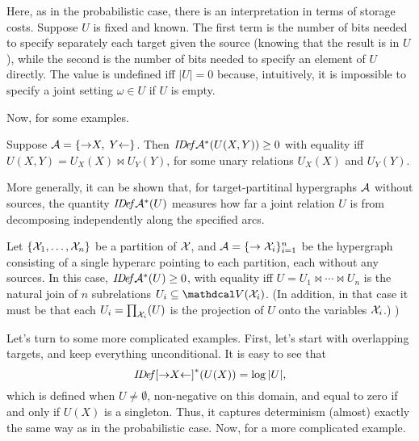 Here, as in the probabilistic case, there is an interpretation in terms of storage costs. 
Suppose $U$ is fixed and known. The first term is the number of bits needed to specify separately each target given the source (knowing that the result is in $U$), while the second is the number of bits needed to specify an element of $U$ directly.
The value is undefined iff $|U| = 0$ because, intuitively, it is impossible to specify a joint setting $\omega \in U$ if $U$ is empty. 


Now, for some examples.
\begin{example}
    Suppose $\mathcal A = \{ {\to} X, \; Y{\gets} \}$. Then 
    $\mathit{I\mskip-3.0muD\mskip-2.5mue\mskip-1.5muf}{\mathcal A}^*(U(X,Y)) \ge 0$ with equality iff $U(X,Y) = U_X(X) \bowtie U_Y(Y)$, for some unary relations $U_X(X)$ and $U_Y(Y)$. 
\end{example}

More generally, it can be shown that, for target-partitinal hypergraphs $\mathcal A$ without sources, the quantity $\mathit{I\mskip-3.0muD\mskip-2.5mue\mskip-1.5muf}{\mathcal A}^*(U)$  measures how far a joint relation $U$ is from decomposing independently along the specified arcs. 

\begin{prop}
    Let $\{\mathcal X_1, \ldots, \mathcal X_n\}$ be a partition of $\mathcal X$, and $\mathcal A = \{\to \mathcal X_i\}_{i =1}^n$ be the hypergraph consisting of a single hyperarc pointing to each partition, each without any sources. 
    In this case, $\mathit{I\mskip-3.0muD\mskip-2.5mue\mskip-1.5muf}{\mathcal A}^*(U) \ge 0$, with equality iff
    $U = U_1 \bowtie \cdots\bowtie U_n$ is the natural join of $n$ subrelations $U_i \subseteq \V(\X_i)$. 
    (In addition, in that case it must be that each $U_i = \prod_{\mathcal X_i}(U)$ is the projection of $U$ onto the variables $\mathcal X_i$.)
)
\end{prop}

Let's turn to some more complicated examples. First, let's start with overlapping targets, and keep everything unconditional. 
It is easy to see that
\[
\mathit{I\mskip-3.0muD\mskip-2.5mue\mskip-1.5muf}{[{\to}X{\gets}]}^*(U(X)) = \log |U|,
\]
which is defined when $U \ne \emptyset$, non-negative on this domain, and equal to zero if and only if $U(X)$ is a singleton. Thus, it captures determinism (almost) exactly the same way as in the probabilistic case. 
Now, for a more complicated example. 


